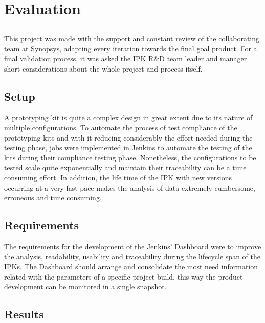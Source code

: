 \chapter{Evaluation}\label{chap:evaluation}

\section*{}

This project was made with the support and constant review of the collaborating team at Synopsys, adapting every iteration towards the final goal product. For a final validation process, it was asked the IPK R\&D team leader and manager short considerations about the whole project and process itself.

\section{Setup}

A prototyping kit is quite a complex design in great extent due to its nature of multiple configurations. To automate the process of test compliance of the prototyping kits and with it reducing considerably the effort needed during the testing phase, jobs were implemented in Jenkins to automate the testing of the kits during their compliance testing phase. Nonetheless, the configurations to be tested scale quite exponentially and maintain their traceability can be a time consuming effort. In addition, the life time of the IPK with new versions occurring at a very fast pace makes the analysis of data extremely cumbersome, erroneous and time consuming.


\section{Requirements}

The requirements for the development of the Jenkins’ Dashboard were to improve the analysis, readability, usability and traceability during the lifecycle span of the IPKs. The Dashboard should arrange and consolidate the most need information related with the parameters of a specific project build, this way the product development can be monitored in a single snapshot. 

\section{Results}

